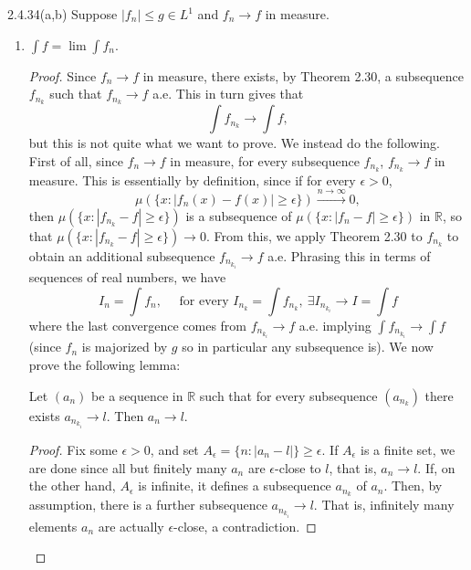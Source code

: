 \documentclass[11pt]{article}
\begin{document}
\begin{problem}{2.4.34(a,b)}
  Suppose \( |f_n| \leq g \in L^1 \) and \( f_n \rightarrow f \) in measure.
  \begin{enumerate}[label=(\alph*)]
    \item \( \int f = \lim \int f_n \).
          \begin{proof}
            Since \( f_n \rightarrow f \) in measure, there exists, by Theorem 2.30, a  subsequence \( f_{n_k} \) such that \( f_{n_k} \rightarrow f \) a.e.
            This in turn gives that
            \begin{equation}
            \label{eq:1}
            \int f_{n_k} \rightarrow \int f,
          \end{equation}
          but this is not quite what we want to prove.
          We instead do the following.
          First of all, since \( f_n \rightarrow f \) in measure, for every subsequence \( f_{n_k} \), \( f_{n_k} \rightarrow f \) in measure.
          This is essentially by definition, since if for every \( \epsilon > 0 \),
          \begin{equation}
          \label{eq:2}
          \mu(\{x:|f_n(x)-f(x)| \geq \epsilon\}) \xrightarrow{n \rightarrow \infty} 0,
        \end{equation}
        then \( \mu(\{x: |f_{n_k} - f| \geq \epsilon\}) \) is a subsequence of \( \mu(\{x: |f_n - f| \geq \epsilon\}) \) in \( \mathbb{R} \), so that \( \mu(\{x: |f_{n_k} - f| \geq \epsilon\}) \rightarrow 0 \).
      From this, we apply Theorem 2.30 to \( f_{n_k} \) to obtain an additional subsequence \( f_{n_{k_i}} \rightarrow f \) a.e.
      Phrasing this in terms of sequences of real numbers, we have
      \begin{equation}
      \label{eq:4}
      I_n = \int f_n, \quad \text{ for every } I_{n_k} = \int f_{n_k}, \ \exists I_{n_{k_i}} \rightarrow I = \int f
    \end{equation}
    where the last convergence comes from \( f_{n_{k_i}} \rightarrow f \) a.e. implying \( \int f_{n_{k_i}} \rightarrow \int f \) (since \( f_n \) is majorized by \( g \) so in particular any subsequence is).
    We now prove the following lemma:
    \begin{lem}
      \label{lem:1}
      Let \( (a_n) \) be a sequence in \( \mathbb{R} \) such that for every subsequence \( (a_{n_k}) \) there exists \( a_{n_{k_i}} \rightarrow l \).
      Then \( a_n \rightarrow l \).
    \end{lem}
    \begin{proof}
      Fix some \(\epsilon > 0\), and set \( A_{\epsilon} = \{n : |a_{n} - l| \} \geq \epsilon\).
      If \( A_{\epsilon} \) is a finite set, we are done since all but finitely many \( a_n \) are \(\epsilon\)-close to \( l \), that is, \( a_n \rightarrow l \).
      If, on the other hand, \( A_{\epsilon} \) is infinite, it defines a subsequence \( a_{n_k} \) of \( a_n \).
      Then, by assumption, there is a further subsequence \( a_{n_{k_i}} \rightarrow l \).
      That is, infinitely many elements \( a_{n} \) are actually \(\epsilon\)-close, a contradiction.
    \end{proof}


\end{proof}
\end{enumerate}
\end{problem}
\end{document}
